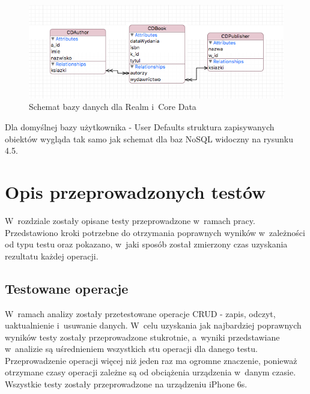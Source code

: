 \begin{figure}[h]
\centering
	\includegraphics[width=\linewidth]{img/database/document-sheme.png}
	\caption{Schemat bazy danych dla Realm i~Core Data}
	\label{fig: nosql_data_scheme}
\end{figure}

Dla domyślnej bazy użytkownika - User Defaults struktura zapisywanych obiektów wygląda tak samo jak schemat dla baz NoSQL widoczny na rysunku 4.5. \par 

\newpage
\section{Opis przeprowadzonych testów}

 W~rozdziale zostały opisane testy przeprowadzone w~ramach pracy. Przedstawiono kroki potrzebne do otrzymania poprawnych wyników w~zależności od typu testu oraz pokazano, w~jaki sposób został zmierzony czas uzyskania rezultatu każdej operacji. 

\subsection{Testowane operacje}

 W~ramach analizy zostały przetestowane operacje CRUD - zapis, odczyt, uaktualnienie i~usuwanie danych. W~celu uzyskania jak najbardziej poprawnych wyników testy zostały przeprowadzone stukrotnie, a~wyniki przedstawiane w~analizie są uśrednieniem wszystkich stu operacji dla danego testu. Przeprowadzenie operacji więcej niż jeden raz ma ogromne znaczenie, ponieważ otrzymane czasy operacji zależne są od obciążenia urządzenia w~danym czasie. Wszystkie testy zostały przeprowadzone na  urządzeniu iPhone 6s. \par

